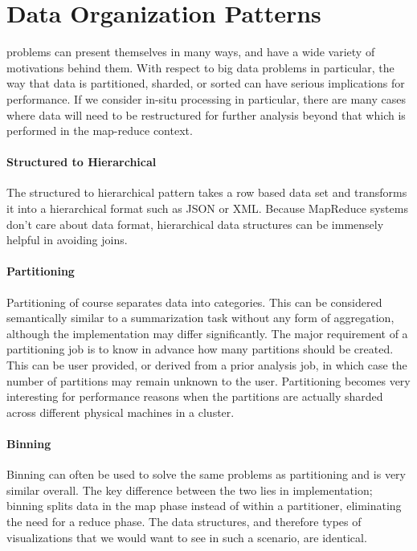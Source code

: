 \section{Data Organization Patterns}
\label{sec:dataorganization}
 problems can present themselves in many ways, and have a wide variety of motivations behind them. With respect to big data problems in particular, the way that data is partitioned, sharded, or sorted can have serious implications for performance. If we consider in-situ processing in particular, there are many cases where data will need to be restructured for further analysis beyond that which is performed in the map-reduce context.

\paragraph{Structured to Hierarchical}
The structured to hierarchical pattern takes a row based data set and transforms it into a hierarchical format such as JSON or XML. Because MapReduce systems don't care about data format, hierarchical data structures can be immensely helpful in avoiding joins.

\paragraph{Partitioning}
Partitioning of course separates data into categories. This can be considered semantically similar to a summarization task without any form of aggregation, although the implementation may differ significantly. The major requirement of a partitioning job is to know in advance how many partitions should be created. This can be user provided, or derived from a prior analysis job, in which case the number of partitions may remain unknown to the user. Partitioning becomes very interesting for performance reasons when the partitions are actually sharded across different physical machines in a cluster.

\paragraph{Binning}
Binning can often be used to solve the same problems as partitioning and is very similar overall. The key difference between the two lies in implementation; binning splits data in the map phase instead of within a partitioner, eliminating the need for a reduce phase. The data structures, and therefore types of visualizations that we would want to see in such a scenario, are identical.

